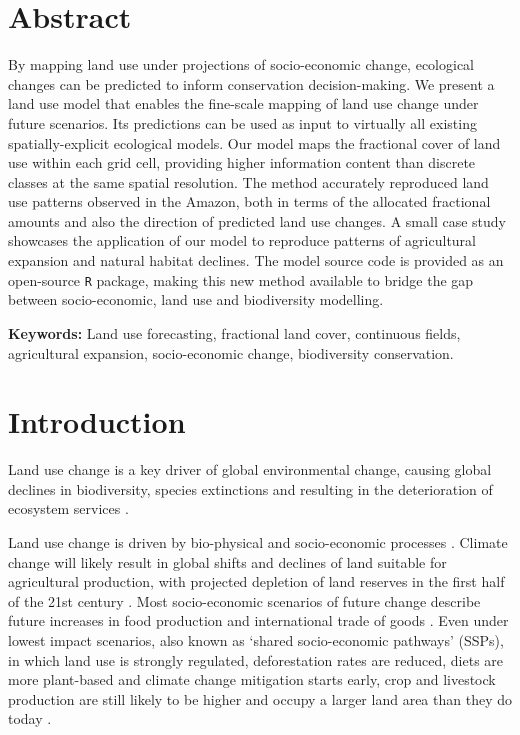 \documentclass[titlesmallcaps,copyrightpage]{uomthesis}\usepackage[]{graphicx}\usepackage[]{color}
\begin{document}
\section{Abstract}

By mapping land use under projections of socio-economic change,
ecological changes can be predicted to inform conservation
decision-making. We present a land use model that enables the fine-scale
mapping of land use change under future scenarios. Its predictions can
be used as input to virtually all existing spatially-explicit ecological
models. Our model maps the fractional cover of land use within each grid
cell, providing higher information content than discrete classes at the
same spatial resolution. The method accurately reproduced land use
patterns observed in the Amazon, both in terms of the allocated
fractional amounts and also the direction of predicted land use changes.
A small case study showcases the application of our model to reproduce
patterns of agricultural expansion and natural habitat declines. The
model source code is provided as an open-source \texttt{R} package, making this
new method available to bridge the gap between socio-economic, land use
and biodiversity modelling.

\vspace{1cm}

\textbf{Keywords:} Land use forecasting, fractional land cover,
continuous fields, agricultural expansion, socio-economic change,
biodiversity conservation.

\section{Introduction}

Land use change is a key driver of global environmental change, causing
global declines in biodiversity, species extinctions and resulting in
the deterioration of ecosystem services
\citep{foley_global_2005, ipbes_summary_2019}.

Land use change is driven by bio-physical and socio-economic processes
\citep{lambin_global_2011}. Climate change will likely result in global
shifts and declines of land suitable for agricultural production, with
projected depletion of land reserves in the first half of the 21st
century \citep{lambin_global_2011}. Most socio-economic scenarios of
future change describe future increases in food production and
international trade of goods \citep{oneill_new_2014, oneill_roads_2017}.
Even under lowest impact scenarios, also known as `shared socio-economic
pathways' (SSPs), in which land use is strongly regulated, deforestation
rates are reduced, diets are more plant-based and climate change
mitigation starts early, crop and livestock production are still likely
to be higher and occupy a larger land area than they do today
\citep{oneill_new_2014}.
\end{document}
